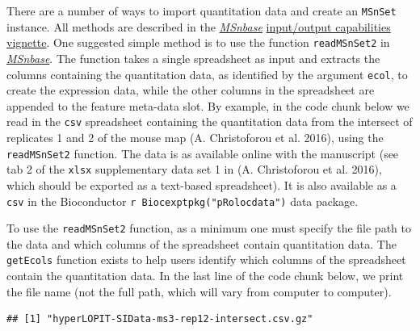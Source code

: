 There are a number of ways to import quantitation data and create an
\texttt{MSnSet} instance. All methods are described in the
\emph{\href{http://bioconductor.org/packages/MSnbase}{MSnbase}}
\href{http://bioconductor.org/packages/release/bioc/vignettes/MSnbase/inst/doc/MSnbase-io.pdf}{input/output
capabilities vignette}. One suggested simple method is to use the
function \texttt{readMSnSet2} in
\emph{\href{http://bioconductor.org/packages/MSnbase}{MSnbase}}. The
function takes a single spreadsheet as input and extracts the columns
containing the quantitation data, as identified by the argument
\texttt{ecol}, to create the expression data, while the other columns in
the spreadsheet are appended to the feature meta-data slot. By example,
in the code chunk below we read in the \texttt{csv} spreadsheet
containing the quantitation data from the intersect of replicates 1 and
2 of the mouse map (A. Christoforou et al. 2016), using the
\texttt{readMSnSet2} function. The data is as available online with the
manuscript (see tab 2 of the \texttt{xlsx} supplementary data set 1 in
(A. Christoforou et al. 2016), which should be exported as a text-based
spreadsheet). It is also available as a \texttt{csv} in the Bioconductor
\texttt{r Biocexptpkg("pRolocdata")} data package.

To use the \texttt{readMSnSet2} function, as a minimum one must specify
the file path to the data and which columns of the spreadsheet contain
quantitation data. The \texttt{getEcols} function exists to help users
identify which columns of the spreadsheet contain the quantitation data.
In the last line of the code chunk below, we print the file name (not
the full path, which will vary from computer to computer).

\begin{Shaded}
\begin{Highlighting}[]
\NormalTok{(}\NormalTok{)}
\StringTok{ }\NormalTok{(}\NormalTok{, } \NormalTok{)}
\StringTok{ } \NormalTok{,}
           \NormalTok{)}
\end{Highlighting}
\end{Shaded}

\begin{verbatim}
## [1] "hyperLOPIT-SIData-ms3-rep12-intersect.csv.gz"
\end{verbatim}


